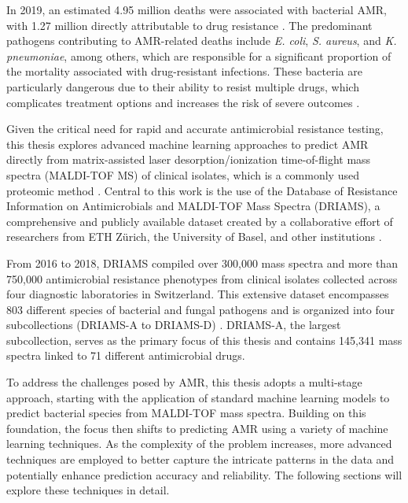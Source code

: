 \documentclass[english,11pt,a4paper,titlepage]{article}
\begin{document}
In 2019, an estimated 4.95 million deaths were associated with bacterial AMR, with 1.27 million directly attributable to drug resistance	\cite{murrayGlobalBurdenBacterial2022}. The predominant pathogens contributing to AMR-related deaths include \textit{E. coli}, \textit{S. aureus}, and \textit{K. pneumoniae}, among others, which are responsible for a significant proportion of the mortality associated with drug-resistant infections. These bacteria are particularly dangerous due to their ability to resist multiple drugs, which complicates treatment options and increases the risk of severe outcomes \cite{murrayGlobalBurdenBacterial2022}.

Given the critical need for rapid and accurate antimicrobial resistance testing, this thesis explores advanced machine learning approaches to predict AMR directly from matrix-assisted laser desorption/ionization time-of-flight mass spectra (MALDI-TOF MS) of clinical isolates, which is a commonly used proteomic method \cite{dauwalderMatrixAssistedLaser2023}. Central to this work is the use of the Database of Resistance Information on Antimicrobials and MALDI-TOF Mass Spectra (DRIAMS), a comprehensive and publicly available dataset created by a collaborative effort of researchers from ETH Zürich, the University of Basel, and other institutions \cite{weis2021driams}.

From 2016 to 2018, DRIAMS compiled over 300,000 mass spectra and more than 750,000 antimicrobial resistance phenotypes from clinical isolates collected across four diagnostic laboratories in Switzerland. This extensive dataset encompasses 803 different species of bacterial and fungal pathogens and is organized into four subcollections (DRIAMS-A to DRIAMS-D) \cite{weisDirectAntimicrobialResistance2022}. DRIAMS-A, the largest subcollection, serves as the primary focus of this thesis and contains 145,341 mass spectra linked to 71 different antimicrobial drugs.

To address the challenges posed by AMR, this thesis adopts a multi-stage approach, starting with the application of standard machine learning models to predict bacterial species from MALDI-TOF mass spectra. Building on this foundation, the focus then shifts to predicting AMR using a variety of machine learning techniques. As the complexity of the problem increases, more advanced techniques are employed to better capture the intricate patterns in the data and potentially enhance prediction accuracy and reliability. The following sections will explore these techniques in detail.
\end{document}
